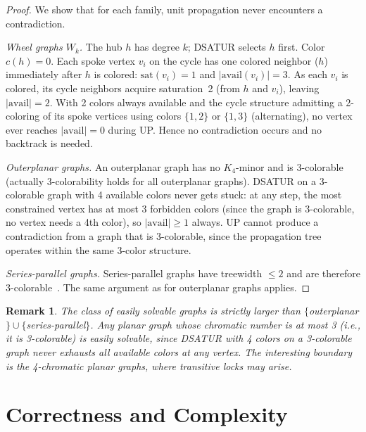 \documentclass[11pt,twocolumn]{article}
\newtheorem{remark}{Remark}
\begin{document}
\begin{proof}
We show that for each family, unit propagation never encounters a
contradiction.

\emph{Wheel graphs $W_k$.}  The hub $h$ has degree $k$; DSATUR selects
$h$ first.  Color $c(h)=0$.  Each spoke vertex $v_i$ on the cycle has one
colored neighbor ($h$) immediately after $h$ is colored: $\mathrm{sat}(v_i)=1$
and $|\mathrm{avail}(v_i)|=3$.  As each $v_i$ is colored, its cycle
neighbors acquire saturation~2 (from $h$ and $v_i$), leaving $|\mathrm{avail}|=2$.
With 2 colors always available and the cycle structure admitting a
2-coloring of its spoke vertices using colors $\{1,2\}$ or $\{1,3\}$
(alternating), no vertex ever reaches $|\mathrm{avail}|=0$ during UP.
Hence no contradiction occurs and no backtrack is needed.

\emph{Outerplanar graphs.}  An outerplanar graph has no $K_4$-minor and
is 3-colorable~\cite{defraysseix1990} (actually 3-colorability holds for
all outerplanar graphs).  DSATUR on a 3-colorable graph with 4 available
colors never gets stuck: at any step, the most constrained vertex has at
most 3 forbidden colors (since the graph is 3-colorable, no vertex needs
a 4th color), so $|\mathrm{avail}|\geq 1$ always.  UP cannot produce a
contradiction from a graph that is 3-colorable, since the propagation
tree operates within the same 3-color structure.

\emph{Series-parallel graphs.}  Series-parallel graphs have treewidth
$\leq 2$ and are therefore 3-colorable~\cite{robertson1997}.  The same
argument as for outerplanar graphs applies.
\end{proof}

\begin{remark}
The class of easily solvable graphs is strictly larger than
$\{$outerplanar$\}\cup\{$series-parallel$\}$.  Any planar graph whose
chromatic number is at most 3 (i.e., it is 3-colorable) is easily
solvable, since DSATUR with 4 colors on a 3-colorable graph never
exhausts all available colors at any vertex.  The interesting boundary
is the 4-chromatic planar graphs, where transitive locks may arise.
\end{remark}

\section{Correctness and Complexity}
\label{sec:complexity}
\end{document}
